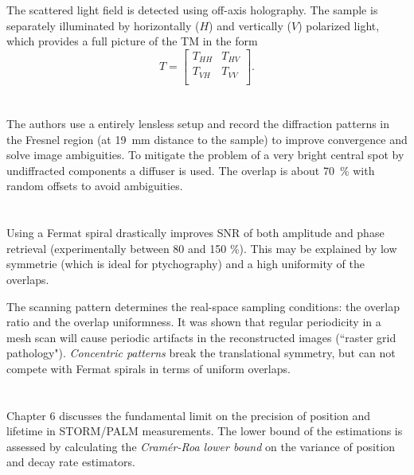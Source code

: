 \documentclass{article}
\begin{document}
The scattered light field is detected using off-axis holography. The sample is separately illuminated by horizontally ($H$) and vertically ($V$) polarized light, which provides a full picture of the TM in the form
\begin{equation}
    T=
    \left[ {\begin{array}{cc}
   T_{HH} & T_{HV} \\
   T_{VH} & T_{VV} \\
  \end{array} } \right].
\end{equation}



\section{\cite{Maiden2010-un} }

The authors use a entirely lensless setup and record the diffraction patterns in the Fresnel region (at \SI{19}{mm} distance to the sample) to improve convergence and solve image ambiguities. To mitigate the problem of a very bright central spot by undiffracted components a diffuser is used.
The overlap is about \SI{70}{\percent} with random offsets to avoid ambiguities.


\section{\cite{Huang2014-yo} }
Using a Fermat spiral drastically improves SNR of both amplitude and phase retrieval (experimentally between 80 and 150 \%). This may be explained by low symmetrie (which is ideal for ptychography) and a high uniformity of the overlaps.

The scanning pattern determines the real-space sampling conditions: the overlap ratio and the overlap uniformness. It was shown that regular periodicity in a mesh scan will cause periodic artifacts in the reconstructed images (``raster grid pathology"). \textit{Concentric patterns} break the translational symmetry, but can not compete with Fermat spirals in terms of uniform overlaps.



\section{\cite{Bouchet2017-hk} }

Chapter 6 discusses the fundamental limit on the precision of position and lifetime in STORM/PALM measurements.
The lower bound of the estimations is assessed by calculating the \textit{Cramér-Roa lower bound} on the variance of position and decay rate estimators. 
\end{document}
